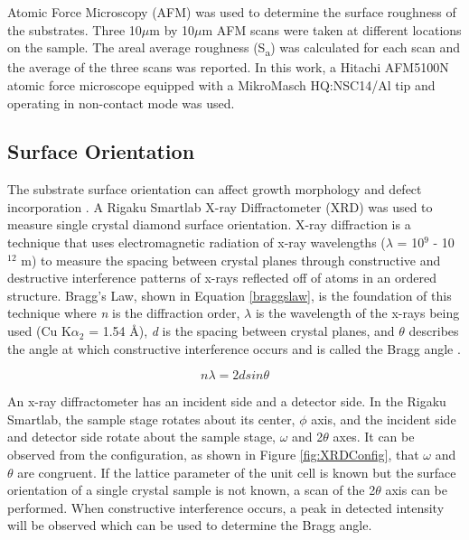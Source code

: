 Atomic Force Microscopy (AFM) was used to determine the surface roughness of the substrates. Three 10$\mu$m by 10$\mu$m AFM scans were taken at different locations on the sample. The areal average roughness (S\textsubscript{a}) was calculated for each scan and the average of the three scans was reported. In this work, a Hitachi AFM5100N
atomic force microscope equipped with a MikroMasch
HQ:NSC14/Al tip and operating in non-contact mode was used.

\subsection{Surface Orientation}
\label{XRD}
\indent

The substrate surface orientation can affect growth morphology and defect incorporation \cite{Burns1990GROWTH-SECTORDIAMONDS,Ushizawa1998BoronDiamond,Takeuchi2000HomoepitaxialSubstrates}. A Rigaku Smartlab X-ray Diffractometer (XRD) was used to measure single crystal diamond surface orientation. X-ray diffraction is a technique that uses electromagnetic radiation of x-ray wavelengths ($\lambda$ = 10$^9$ - 10$^{12}$ m) to measure the spacing between crystal planes through constructive and destructive interference patterns of x-rays reflected off of atoms in an ordered structure. Bragg's Law, shown in Equation \ref{braggslaw}, is the foundation of this technique where \textit{n} is the diffraction order, $\lambda$ is the wavelength of the x-rays being used (Cu K$\alpha_2$ = 1.54 \AA), \textit{d} is the spacing between crystal planes, and $\theta$ describes the angle at which constructive interference occurs and is called the Bragg angle \cite{Bragg1913TheCrystals,Maskil1988StructureLine}.

\begin{equation}
\label{braggslaw}
    n\lambda=2dsin\theta
\end{equation}

An x-ray diffractometer has an incident side and a detector side. In the Rigaku Smartlab, the sample stage rotates about its center, $\phi$ axis, and the incident side and detector side rotate about the sample stage, $\omega$ and 2$\theta$ axes. It can be observed from the configuration, as shown in Figure \ref{fig:XRDConfig}, that $\omega$ and $\theta$ are congruent. If the lattice parameter of the unit cell is known but the surface orientation of a single crystal sample is not known, a scan of the 2$\theta$ axis can be performed. When constructive interference occurs, a peak in detected intensity will be observed which can be used to determine the Bragg angle. 

